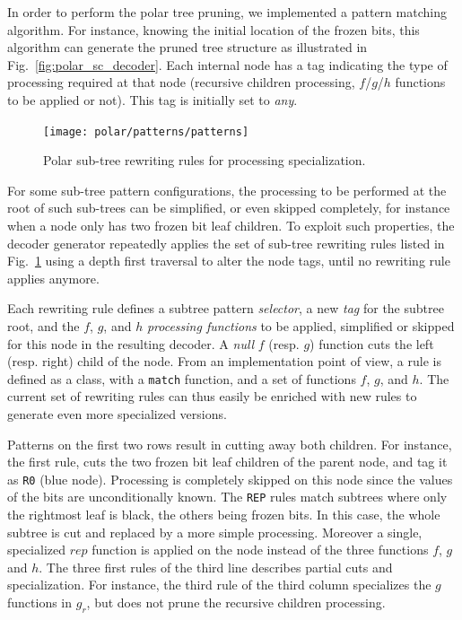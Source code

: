 In order to perform the polar tree pruning, we implemented a pattern matching
algorithm. For instance, knowing the initial location of the frozen bits, this
algorithm can generate the pruned tree structure as illustrated in
Fig.~\ref{fig:polar_sc_decoder}. Each internal node has a tag indicating the
type of processing required at that node (recursive children processing,
$f$/$g$/$h$ functions to be applied or not). This tag is initially set to
\emph{any}.

\begin{figure}[htp]
  \centering
  \texttt{[image: polar/patterns/patterns]}
  \caption{Polar sub-tree rewriting rules for processing specialization.}
  \label{fig:polar_patterns}
\end{figure}

For some sub-tree pattern configurations, the processing to be performed at the
root of such sub-trees can be simplified, or even skipped completely, for
instance when a node only has two frozen bit leaf children. To exploit such
properties, the decoder generator repeatedly applies the set of sub-tree
rewriting rules listed in Fig.~\ref{fig:polar_patterns} using a depth first
traversal to alter the node tags, until no rewriting rule applies anymore.

Each rewriting rule defines a subtree pattern \emph{selector}, a new \emph{tag}
for the subtree root, and the $f$, $g$, and $h$ \emph{processing functions} to
be applied, simplified or skipped for this node in the resulting decoder. A
\emph{null} $f$ (resp. $g$) function cuts the left (resp. right) child of the
node. From an implementation point of view, a rule is defined as a class, with a
\verb|match| function, and a set of functions $f$, $g$, and $h$. The current
set of rewriting rules can thus easily be enriched with new rules to generate
even more specialized versions.

Patterns on the first two rows result in cutting away both children. For
instance, the first rule, cuts the two frozen bit leaf children of the parent
node, and tag it as \verb|R0| (blue node). Processing is completely skipped on
this node since the values of the bits are unconditionally known. The \verb|REP|
rules match subtrees where only the rightmost leaf is black, the others being
frozen bits. In this case, the whole subtree is cut and replaced by a more
simple processing. Moreover a single, specialized $rep$ function is applied
on the node instead of the three functions $f$, $g$ and $h$. The three first
rules of the third line describes partial cuts and specialization. For instance,
the third rule of the third column specializes the $g$ functions in $g_r$, but
does not prune the recursive children processing.

